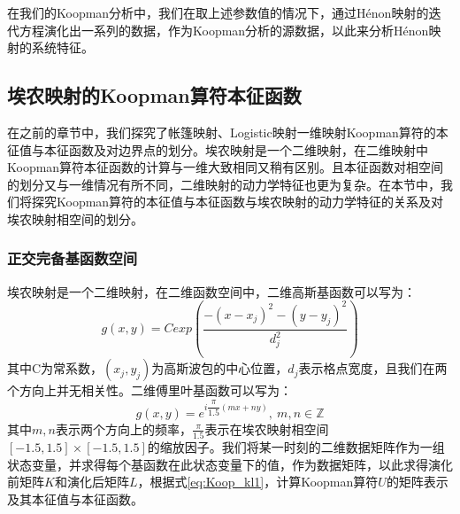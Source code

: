 在我们的Koopman分析中，我们在取上述参数值的情况下，通过H\'{e}non映射的迭代方程演化出一系列的数据，作为Koopman分析的源数据，以此来分析H\'{e}non映射的系统特征。


\subsection{埃农映射的Koopman算符本征函数}
在之前的章节中，我们探究了帐篷映射、Logistic映射一维映射Koopman算符的本征值与本征函数及对边界点的划分。埃农映射是一个二维映射，在二维映射中Koopman算符本征函数的计算与一维大致相同又稍有区别。且本征函数对相空间的划分又与一维情况有所不同，二维映射的动力学特征也更为复杂。在本节中，我们将探究Koopman算符的本征值与本征函数与埃农映射的动力学特征的关系及对埃农映射相空间的划分。


\subsubsection{正交完备基函数空间}
埃农映射是一个二维映射，在二维函数空间中，二维高斯基函数可以写为：
\begin{equation}
  g(x,y)=Cexp({\dfrac{-(x-x_j)^2-(y-y_j)^2}{d_j^2}})
\end{equation}
其中C为常系数，$(x_j,y_j)$为高斯波包的中心位置，$d_j$表示格点宽度，且我们在两个方向上并无相关性。二维傅里叶基函数可以写为：
\begin{equation}
  g(x,y)=e^{i\dfrac{\pi}{1.5}(mx+ny)},\ m,n\in\mathbb{Z}
\end{equation}
其中$m,n$表示两个方向上的频率，$\frac{\pi}{1.5}$表示在埃农映射相空间$[-1.5,1.5]\times [-1.5,1.5]$的缩放因子。我们将某一时刻的二维数据矩阵作为一组状态变量，并求得每个基函数在此状态变量下的值，作为数据矩阵，以此求得演化前矩阵$K$和演化后矩阵$L$，根据式\eqref{eq:Koop_kl1}，计算Koopman算符$U$的矩阵表示及其本征值与本征函数。

